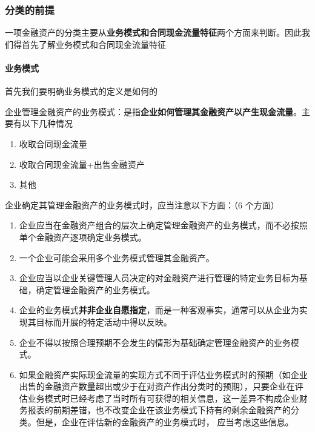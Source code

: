 \documentclass[UTF8,12pt]{ctexart}
\numberwithin{equation}{section} %
\numberwithin{figure}{section}
\numberwithin{table}{section}
\begin{document}
	\subsubsection{分类的前提}
	一项金融资产的分类主要从\textbf{业务模式和合同现金流量特征}两个方面来判断。因此我们得首先了解业务模式和合同现金流量特征
	
	\paragraph{业务模式}首先我们要明确业务模式的定义是如何的
	
	企业管理金融资产的业务模式：是指\textbf{企业如何管理其金融资产以产生现金流量}。主要有以下几种情况
	\begin{enumerate}
		\item 收取合同现金流量
		
		\item 收取合同现金流量+出售金融资产
		
		\item 其他
	\end{enumerate}
	
	企业确定其管理金融资产的业务模式时，应当注意以下方面：（6 个方面）
	\begin{enumerate}
		\item 企业应当在金融资产组合的层次上确定管理金融资产的业务模式，而不必按照单个金融资产逐项确定业务模式。
		
		\item 一个企业可能会采用多个业务模式管理其金融资产。
		
		\item 企业应当以企业关键管理人员决定的对金融资产进行管理的特定业务目标为基础，确定管理金融资产的业务模式。
		
		\item 企业的业务模式\textbf{并非企业自愿指定}，而是一种客观事实，通常可以从企业为实现其目标而开展的特定活动中得以反映。
		
		\item 企业不得以按照合理预期不会发生的情形为基础确定管理金融资产的业务模式。
		
		\item 如果金融资产实际现金流量的实现方式不同于评估业务模式时的预期（如企业出售的金融资产数量超出或少于在对资产作出分类时的预期），只要企业在评估业务模式时已经考虑了当时所有可获得的相关信息，这一差异不构成企业财务报表的前期差错，也不改变企业在该业务模式下持有的剩余金融资产的分类。但是，企业在评估新的金融资产的业务模式时， 应当考虑这些信息。
	\end{enumerate}
	
\end{document}
